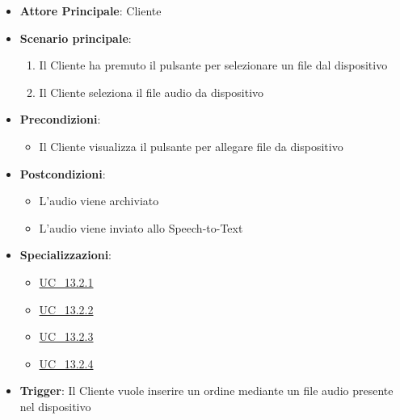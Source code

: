 \begin{itemize}
    \item \textbf{Attore Principale}: Cliente
    \item \textbf{Scenario principale}:
        \begin{enumerate}
            \item Il Cliente ha premuto il pulsante per selezionare un file dal dispositivo
            \item Il Cliente seleziona il file audio da dispositivo
        \end{enumerate}
    \item \textbf{Precondizioni}:
        \begin{itemize}
            \item Il Cliente visualizza il pulsante per allegare file da dispositivo
        \end{itemize}
    \item \textbf{Postcondizioni}: 
        \begin{itemize}
            \item L'audio viene archiviato
            \item L'audio viene inviato allo Speech-to-Text 
        \end{itemize}
    \item \textbf{Specializzazioni}:
        \begin{itemize}
            \item \hyperref[uc_13.2.1]{UC\_13.2.1}
            \item \hyperref[uc_13.2.2]{UC\_13.2.2}
            \item \hyperref[uc_13.2.3]{UC\_13.2.3}
            \item \hyperref[uc_13.2.4]{UC\_13.2.4}
        \end{itemize}
    \item \textbf{Trigger}: Il Cliente vuole inserire un ordine mediante un file audio presente nel dispositivo
\end{itemize}

\label{uc_13.2.1}

